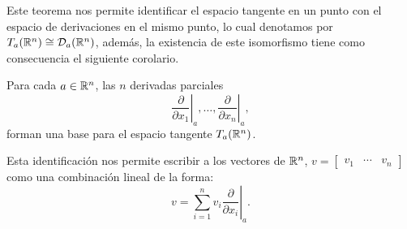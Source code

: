 Este teorema nos permite identificar el espacio tangente en un punto con el
espacio de derivaciones en el mismo punto, lo cual denotamos por $T_a(\mathbb{R}^n)
\cong \mathcal{D}_a(\mathbb{R}^n)$, además, la existencia de este isomorfismo tiene como consecuencia el siguiente corolario.

\begin{corollary}\label{Corolario: Base de TpRn}
	Para cada $a \in \mathbb{R}^n$, las $n$ derivadas parciales
	\[
		\left. \frac{\partial }{\partial x_1} \right|_{a}, \dots, \left. \frac{\partial }{\partial x_n} \right|_{a},
	\]
	forman una base para el espacio tangente $T_a(\mathbb{R}^n)$.
\end{corollary}

Esta identificación nos permite escribir a los vectores de $\mathbb{R}^n$, $v = \begin{bmatrix} v_1 & \cdots & v_n \end{bmatrix}$ como una combinación lineal de la forma:
\[ 	v = \left. \sum_{i = 1}^{n} v_i \frac{\partial}{\partial x_i} \right|_{a}.\]
